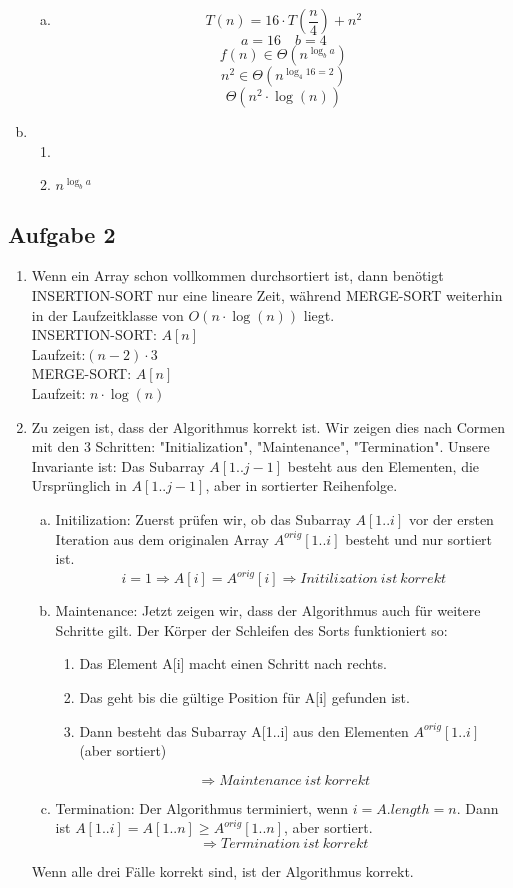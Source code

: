 \documentclass[a4paper,fleqn]{scrartcl}
\begin{document}
\begin{enumerate}[a)]
\begin{enumerate}[(a)]
  \item \[ T(n) = 16 \cdot T\left( \frac{n}{4} \right) + n^2 \]
\[ a= 16 \quad b = 4 \]
\[ f(n) \in \Theta \left( n^{\log_b a} \right) \]
\[ n^2 \in \Theta \left( n^{\log_4 16=2} \right) \]
\[ \Theta \left(n^2 \cdot \log(n)\right) \]
 \end{enumerate}

 \item 
 \begin{enumerate}[1.]
  \item 
  \item $ n^{\log_b a} $
 \end{enumerate}

\end{enumerate}
 
\subsection*{Aufgabe 2}
\begin{enumerate}[1.]
\item
Wenn ein Array schon vollkommen durchsortiert ist, dann benötigt INSERTION-SORT nur eine lineare Zeit, während MERGE-SORT weiterhin in der Laufzeitklasse von $O\left(n \cdot \log(n)\right)$ liegt. \\
INSERTION-SORT: $A[n]$ \\
Laufzeit:$(n-2)\cdot 3$ \\
MERGE-SORT: $A[n]$ \\
Laufzeit: $n\cdot \log(n)$

\item Zu zeigen ist, dass der Algorithmus korrekt ist. Wir zeigen dies nach
Cormen mit den 3 Schritten: "Initialization", "Maintenance", "Termination".
Unsere Invariante ist: Das Subarray \(A[1..j-1]\) besteht aus den Elementen, die
Ursprünglich in \(A[1..j-1]\), aber in sortierter Reihenfolge.
\begin{enumerate}[(a)]
\item Initilization: Zuerst prüfen wir, ob das Subarray \(A[1..i]\) vor der
ersten Iteration aus dem originalen Array \(A^{orig}[1..i]\) besteht und
nur sortiert ist.
\[i = 1 \Rightarrow A[i] = A^{orig}[i] \Rightarrow Initilization\ ist\ korrekt\]
\item Maintenance: Jetzt zeigen wir, dass der Algorithmus auch für weitere Schritte gilt.
Der Körper der Schleifen des Sorts funktioniert so:
\begin{enumerate}
\item Das Element A[i] macht einen Schritt nach rechts.
\item Das geht bis die gültige Position für A[i] gefunden ist.
\item Dann besteht das Subarray A[1..i] aus den Elementen \(A^{orig}[1..i]\) (aber sortiert)
\end{enumerate}
\[\Rightarrow Maintenance\ ist\ korrekt\]
\item Termination: Der Algorithmus terminiert, wenn \(i=A.length = n\).
Dann ist \(A[1..i] = A[1..n] \geq A^{orig}[1..n]\), aber sortiert.
\[\Rightarrow Termination\ ist\ korrekt\]
\end{enumerate}
Wenn alle drei Fälle korrekt sind, ist der Algorithmus korrekt.
\end{enumerate}
\end{document}
